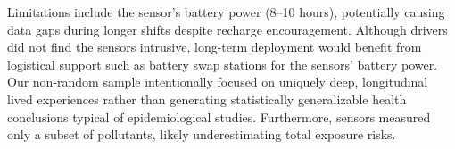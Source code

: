 

Limitations include the sensor's battery power (8–10 hours), potentially causing data gaps during longer shifts despite recharge encouragement.
Although drivers did not find the sensors intrusive, long-term deployment would benefit from logistical support such as battery swap stations for the sensors' battery power.
Our non-random sample intentionally focused on uniquely deep, longitudinal lived experiences rather than generating statistically generalizable health conclusions typical of epidemiological studies.
Furthermore, sensors measured only a subset of pollutants, likely underestimating total exposure risks.
